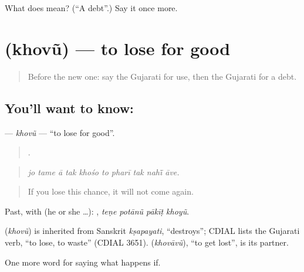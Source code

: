 \begin{tcolorbox}[breakable,colback=teal!4,colframe=teal!35!black,title={Before you move on}]
What does  mean? (\textquotedblleft{}A debt\textquotedblright{}.) Say it once more.
\end{tcolorbox}
\section[\texorpdfstring{\gu{ખોવું} (khovũ)}{ખોવું (khovũ)}]{ (khovũ) — to lose for good}

\label{lesson:GU-C371-khovu}



\begin{quote}
Before the new one: say the Gujarati for use, then the Gujarati for a debt.
\end{quote}

\subsection*{You'll want to know: }
\textbf{} — \emph{khovũ} — \textquotedblleft{}to lose for good\textquotedblright{}.

\begin{quote}
         .
\end{quote}

\begin{quote}
\emph{jo tame ā tak khośo to pharī tak nahī̃ āve.}
\end{quote}

\begin{quote}
If you lose this chance, it will not come again.
\end{quote}

Past, with  (he or she …):    , \emph{teṇe potānũ pākīṭ khoyũ}.

\begin{cousinweb}
\textbf{} (\emph{khovũ}) is inherited from Sanskrit \emph{kṣapayati}, \textquotedblleft{}destroys\textquotedblright{}; CDIAL lists the Gujarati verb, \textquotedblleft{}to lose, to waste\textquotedblright{} (CDIAL 3651). \textbf{} (\emph{khovāvũ}), \textquotedblleft{}to get lost\textquotedblright{}, is its partner.
\end{cousinweb}

\begin{grammarlens}[title={What you've built}]
One more word for saying what happens if.
\end{grammarlens}

